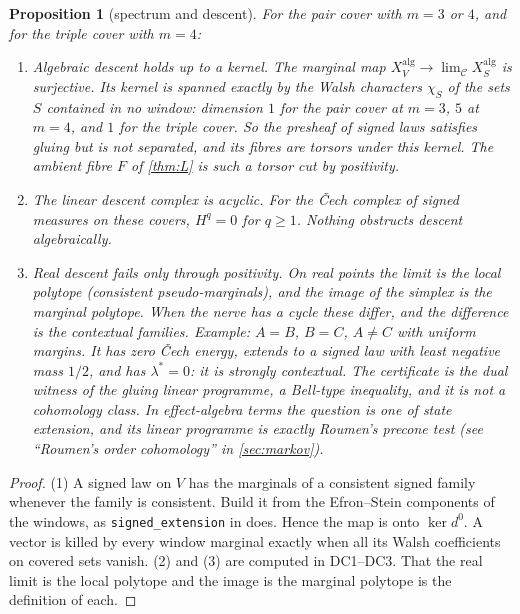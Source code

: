 \documentclass[11pt]{article}
\newtheorem{proposition}{Proposition}\newtheorem{corollary}{Corollary}\newtheorem{lemma}{Lemma}
\theoremstyle{definition}\newtheorem{definition}{Definition}\newtheorem{remark}{Remark}
\begin{document}
\begin{proposition}[spectrum and descent]\label{prop:spectrum}
For the pair cover with $m=3$ or $4$, and for the triple cover with $m=4$:
\begin{enumerate}
\item[(1)] \emph{Algebraic descent holds up to a kernel.} The marginal map $X^{\mathrm{alg}}_V\to\lim_{\mathcal C}X^{\mathrm{alg}}_S$ is
  surjective. Its kernel is spanned exactly by the Walsh characters $\chi_S$ of the sets $S$ contained in no window: dimension $1$
  for the pair cover at $m=3$, $5$ at $m=4$, and $1$ for the triple cover. So the presheaf of signed laws satisfies gluing but is not
  separated, and its fibres are torsors under this kernel. The ambient fibre $F$ of \cref{thm:L} is such a torsor cut by positivity.
\item[(2)] \emph{The linear descent complex is acyclic.} For the Čech complex of signed measures on these covers, $H^q=0$ for
  $q\ge1$. Nothing obstructs descent algebraically.
\item[(3)] \emph{Real descent fails only through positivity.} On real points the limit is the local polytope (consistent pseudo-marginals),
  and the image of the simplex is the marginal polytope. When the nerve has a cycle these differ, and the difference is the contextual
  families. Example: $A=B$, $B=C$, $A\ne C$ with uniform margins. It has zero Čech energy, extends to a signed law with least negative
  mass $1/2$, and has $\lambda^*=0$: it is strongly contextual. The certificate is the dual witness of the gluing linear programme, a
  Bell-type inequality, and it is not a cohomology class. In effect-algebra terms the question is one of state extension, and its
  linear programme is exactly Roumen's precone test (see ``Roumen's order cohomology'' in \cref{sec:markov}).
\end{enumerate}
\end{proposition}

\begin{proof}
(1) A signed law on $V$ has the marginals of a consistent signed family whenever the family is consistent. Build it from the
Efron--Stein components of the windows, as \texttt{signed\_extension} in \cite{PG} does. Hence the map is onto $\ker d^0$. A vector is
killed by every window marginal exactly when all its Walsh coefficients on covered sets vanish. (2) and (3) are computed in DC1--DC3.
That the real limit is the local polytope and the image is the marginal polytope is the definition of each.
\end{proof}
\end{document}
